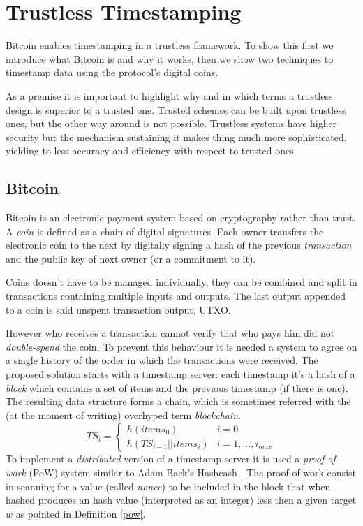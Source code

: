 \chapter{Trustless Timestamping}
\label{chpr:trustless}
Bitcoin enables timestamping in a trustless framework. 
To show this first we introduce what Bitcoin is and why it works, then we show two techniques to timestamp data using the protocol's digital coins.

As a premise it is important to highlight why and in which terms a trustless design is superior to a trusted one. 
Trusted schemes can be built upon trustless ones, but the other way around is not possible. 
Trustless systems have higher security but the mechanism sustaining it makes thing much more sophisticated, yielding to less accuracy and efficiency with respect to trusted ones.

\section{Bitcoin}
Bitcoin is an electronic payment system based on cryptography rather than trust. A \textit{coin} is defined as a chain of digital signatures. Each owner transfers the electronic coin to the next by digitally signing a hash of the previous \textit{transaction} and the public key of next owner (or a commitment to it).

Coins doesn't have to be managed individually, they can be combined and split in transactions containing multiple inputs and outputs. The last output appended to a coin is said unspent transaction output, UTXO.

However who receives a transaction cannot verify that who pays him did not \textit{double-spend} the coin. 
To prevent this behaviour it is needed a system to agree on a single history of the order in which the transactions were received. The proposed solution starts with a timestamp server: each timestamp it's a hash of a \textit{block} which contains a set of items and the previous timestamp (if there is one). The resulting data structure forms a chain, which is sometimes referred with the (at the moment of writing) overhyped term \textit{blockchain}. 
\begin{equation}
	TS_i =
	\begin{cases} 
		h(items_0) & i=0\\ 
		h(TS_{i-1} || items_i) & i=1, ..., i_{max} 
	\end{cases}
\end{equation}
To implement a \textit{distributed} version of a timestamp server it is used a \textit{proof-of-work} (PoW) system similar to Adam Back's Hashcash \cite{Back02hashcash-}. The proof-of-work consist in scanning for a value (called \textit{nonce}) to be included in the block that when hashed produces an hash value (interpreted as an integer) less then a given target $w$ as pointed in Definition \ref{pow}.


